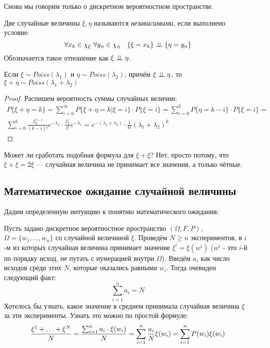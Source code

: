 \begin{note}
	Снова мы говорим только о дискретном вероятностном пространстве.
\end{note}

\begin{definition}
	Две случайные величины $\xi, \eta$ называются \textit{независимыми}, если выполнено условие:
	\[
		\forall x_k \in \chi_\xi\ \forall y_n \in \chi_\eta \quad \{\xi = x_k\} \perp\mkern-9.5mu\perp \{\eta = y_n\}
	\]
	Обозначается такое отношение как $\xi \perp\mkern-9.5mu\perp \eta$.
\end{definition}

\begin{proposition}
	Если $\xi \sim Poiss(\lambda_1)$ и $\eta \sim Poiss(\lambda_2)$, причём $\xi \perp\mkern-9.5mu\perp \eta$, то $\xi + \eta \sim Poiss(\lambda_1 + \lambda_2)$
\end{proposition}

\begin{proof}
	Распишем вероятность суммы случайных величин:
	\begin{multline*}
		P\{\xi + \eta = k\} = \sum_{i = 0}^\infty P\{\xi + \eta = k | \xi = i\} \cdot P\{\xi = i\} = \sum_{i = 0}^k P\{\eta = k - i\} \cdot P\{\xi = i\} =
		\\
		\sum_{i = 0}^k \frac{\lambda_2^{k - i}}{(k - i)!} e^{-\lambda_2} \cdot \frac{\lambda_1^{i}}{i!} e^{-\lambda_1} = e^{-(\lambda_1 + \lambda_2)} \cdot \frac{1}{k!} (\lambda_1 + \lambda_2)^k
	\end{multline*}
\end{proof}

\begin{note}
	Может ли сработать подобная формула для $\xi + \xi$? Нет, просто потому, что $\xi + \xi = 2\xi$ --- случайная величина не принимает все значения, а только чётные.
\end{note}

\subsection{Математическое ожидание случайной величины}

\begin{note}
	Дадим определенную интуицию к понятию математического ожидания:
	
	Пусть задано дискретное вероятностное пространство $(\Omega, F, P)$, $\Omega = \{w_1, \ldots, w_n\}$ со случайной величиной $\xi$. Проведём $N \ge n$ экспериментов, в $i$-м из которых случайная величина принимает значение $\xi^i = \xi(w^i)$ ($w^i$ - это $i$-й по порядку исход, не путать с нумерацией внутри $\Omega$). Введём $a_i$ как число исходов среди этих $N$, которые оказались равными $w_i$. Тогда очевиден следующий факт:
	\[
		\sum_{i = 1}^n a_i = N
	\]
	Хотелось бы узнать, какое значение в среднем принимала случайная величина $\xi$ за эти эксперименты. Узнать это можно по простой формуле:
	\[
		\frac{\xi^1 + \ldots + \xi^N}{N} = \frac{\sum_{i = 1}^n a_i \cdot \xi(w_i)}{N} = \sum_{i = 1}^n \frac{a_i}{N} \xi(w_i) = \sum_{i = 1}^n P(w_i) \xi(w_i)
	\]
\end{note}

